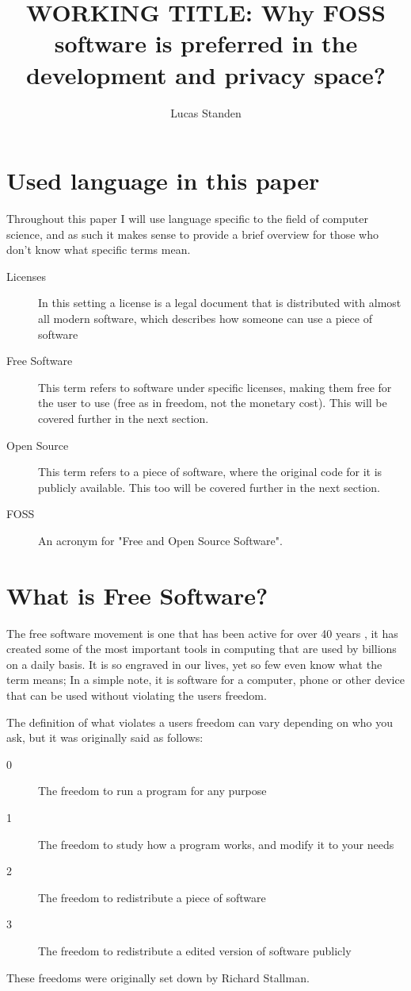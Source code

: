 \documentclass[a4paper,12pt]{article}
\author{Lucas Standen}
\title{WORKING TITLE: Why FOSS software is preferred in the 
development and privacy space?}
\begin{document}
\maketitle

\newpage
\tableofcontents
\newpage

{\setlength{\parindent}{0cm}

\section{Used language in this paper}
Throughout this paper I will use language specific to the field of computer science, and as such
it makes sense to provide a brief overview for those who don't know what specific terms mean.
\begin{description}
	\item[Licenses] In this setting a license is a legal document that is distributed with
		almost all modern software, which describes how someone can use a piece of software
	\item[Free Software] This term refers to software under specific licenses, making them 
		free for the user to use (free as in freedom, not the monetary cost). This will
		be covered further in the next section.
	\item[Open Source] This term refers to a piece of software, where the original code for it
		is publicly available. This too will be covered further in the next section.
	\item[FOSS] An acronym for "Free and Open Source Software".
\end{description}

\section{What is Free Software?}
The free software movement is one that has been active for over 40 years \cite{GNUmaifesto}, it has
created some of the most important tools in computing that are used by billions on a daily basis. 
It is so engraved in our lives, yet so few even know what the term means; In a simple note, it is
software for a computer, phone or other device that can be used without violating the users 
freedom.

The definition of what violates a users freedom can vary depending on who you ask, but it was
originally said as follows:
\begin{description}
	\item[0] The freedom to run a program for any purpose
	\item[1] The freedom to study how a program works, and modify it to your needs
	\item[2] The freedom to redistribute a piece of software
	\item[3] The freedom to redistribute a edited version of software publicly
\end{description}
These freedoms were originally set down by Richard Stallman\cite{FOSSdef}.
}
\end{document}
